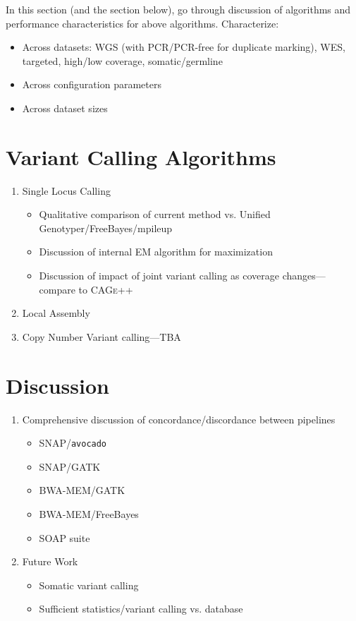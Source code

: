 \documentclass[11pt]{article}
\begin{document}
In this section (and the section below), go through discussion of algorithms and performance characteristics for above algorithms. Characterize:

\begin{itemize}
\item Across datasets: WGS (with PCR/PCR-free for duplicate marking), WES, targeted, high/low coverage, somatic/germline
\item Across configuration parameters
\item Across dataset sizes
\end{itemize}

\section{Variant Calling Algorithms}
\label{sec:call}

\begin{enumerate}
\item Single Locus Calling
\begin{itemize}
\item Qualitative comparison of current method vs. Unified Genotyper/FreeBayes/mpileup
\item Discussion of internal EM algorithm for maximization
\item Discussion of impact of joint variant calling as coverage changes---compare to \textsc{CAGe++}
\end{itemize}
\item Local Assembly
\item Copy Number Variant calling---TBA
\end{enumerate}

\section{Discussion}

\begin{enumerate}
\item Comprehensive discussion of concordance/discordance between pipelines
\begin{itemize}
\item SNAP/\texttt{avocado}
\item SNAP/GATK
\item BWA-MEM/GATK
\item BWA-MEM/FreeBayes
\item SOAP suite
\end{itemize}
\item Future Work
\begin{itemize}
\item Somatic variant calling
\item Sufficient statistics/variant calling vs. database
\end{itemize}
\end{enumerate}
\end{document}
